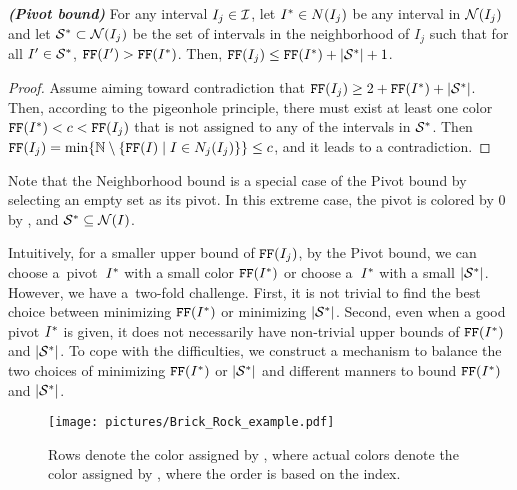 \begin{lemma}\emph{\textbf{(Pivot bound)}}
    \label{lem:prop_ff_equiv}
    For any interval $I_j \in \mathcal{I}$, let $I^* \in N(I_j)$ be any interval in $\mathcal{N}(I_j)$ and let $\mathcal{S}^* \subset \mathcal{N}(I_j)$ be the set of intervals in the neighborhood of $I_j$ such that for all $I^\prime\in \mathcal{S}^*$, $\texttt{FF}(I^\prime)>\texttt{FF}(I^*)$.
    Then, $\texttt{FF}(I_j) \leq \texttt{FF}(I^*) + |\mathcal{S}^*| + 1$.
\end{lemma}

\begin{proof}
    Assume aiming toward contradiction that $\text{\texttt{FF}}(I_j) \geq 2 + \text{\texttt{FF}}(I^*) + |\mathcal{S}^*|$.
    Then, according to the pigeonhole principle, there must exist at least one color $\text{\texttt{FF}}(I^*) < c < \text{\texttt{FF}}(I_j)$ that is not assigned to any of the intervals in $\mathcal{S}^*$.
    Then $\text{\texttt{FF}}(I_j) = \min \{ \mathbb{N} \setminus \{ \text{\texttt{FF}}(I) \mid I \in N_j(I_j) \} \} \leq c$, and it leads to a contradiction.
\end{proof}

Note that the Neighborhood bound is a special case of the Pivot bound by selecting an empty set as its pivot. In this extreme case, the pivot is colored by $0$ by \ff, and $\mathcal{S}^* \subseteq \mathcal{N}(I)$.

Intuitively, for a smaller upper bound of $\text{\texttt{FF}}(I_j)$, by the Pivot bound, we can choose a~pivot~$I^*$ with a small color $\text{\texttt{FF}}(I^*)$ or choose a~$I^*$ with a small $|\mathcal{S}^*|$. 
However, we have a~two-fold challenge. 
First, it is not trivial to find the best choice between minimizing $\text{\texttt{FF}}(I^*)$ or minimizing $|\mathcal{S}^*|$. 
Second, even when a good pivot $I^*$ is given, it does not necessarily have non-trivial upper bounds of $\text{\texttt{FF}}(I^*)$ and $|\mathcal{S}^*|$.
To cope with the difficulties, we construct a mechanism to balance the two choices of minimizing $\text{\texttt{FF}}(I^*)$ or $|\mathcal{S}^*|$ and different manners to bound $\text{\texttt{FF}}(I^*)$ and $|\mathcal{S}^*|$.


\begin{figure}[t]
    \centering
    \texttt{[image: pictures/Brick\_Rock\_example.pdf]}
    \caption{Rows denote the color assigned by \opt, where actual colors denote the color assigned by \ff, where the order is based on the index.}
    \label{fig:example_of_a_row}
\end{figure}

